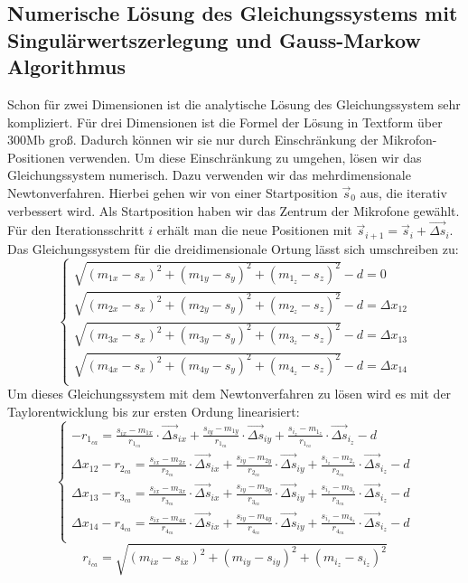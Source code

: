\subsection{Numerische Lösung des Gleichungssystems mit Singulärwertszerlegung und Gauss-Markow Algorithmus}
Schon für zwei Dimensionen ist die analytische Lösung des Gleichungssystem sehr kompliziert. Für drei Dimensionen ist die Formel der Lösung in Textform über 300Mb groß. Dadurch können wir sie nur durch Einschränkung der Mikrofon-Positionen verwenden. Um diese Einschränkung zu umgehen, lösen wir das Gleichungssystem numerisch. Dazu verwenden wir das mehrdimensionale Newtonverfahren. Hierbei gehen wir von einer Startposition $\vec{s}_0$ aus, die iterativ verbessert wird. Als Startposition haben wir das Zentrum der Mikrofone gewählt. Für den Iterationsschritt $i$ erhält man die neue Positionen mit $\vec{s}_{i + 1} = \vec{s}_i + \vec{\Delta{s}}_i$. Das Gleichungssystem für die dreidimensionale Ortung lässt sich umschreiben zu:
$$\begin{cases}
\sqrt{(m_{1x} - s_x)^2 + (m_{1y} - s_y)^2 + (m_{1_z} - s_z)^2} - d = 0 \\
\sqrt{(m_{2x} - s_x)^2 + (m_{2y} - s_y)^2 + (m_{2_z} - s_z)^2} - d = \Delta{x_{12}} \\
\sqrt{(m_{3x} - s_x)^2 + (m_{3y} - s_y)^2 + (m_{3_z} - s_z)^2} - d = \Delta{x_{13}} \\
\sqrt{(m_{4x} - s_x)^2 + (m_{4y} - s_y)^2 + (m_{4_z} - s_z)^2} - d = \Delta{x_{14}} \\
\end{cases}$$
Um dieses Gleichungssystem mit dem Newtonverfahren zu lösen wird es mit der Taylorentwicklung bis zur ersten Ordung linearisiert:
$$\begin{cases}
-r_{1_{ca}} = \frac{s_{ix} - m_{1x}}{r_{1_{ca}}} \cdot \vec{\Delta{s}}_{ix} + \frac{s_{iy} - m_{1y}}{r_{1_{ca}}} \cdot \vec{\Delta{s}}_{iy} + \frac{s_{i_z} - m_{1_z}}{r_{1_{ca}}} \cdot \vec{\Delta{s}}_{i_z} - d \\
\Delta{x_{12}} - r_{2_{ca}} = \frac{s_{ix} - m_{2x}}{r_{2_{ca}}} \cdot \vec{\Delta{s}}_{ix} + \frac{s_{iy} - m_{2y}}{r_{2_{ca}}} \cdot \vec{\Delta{s}}_{iy} + \frac{s_{i_z} - m_{2_z}}{r_{2_{ca}}} \cdot \vec{\Delta{s}}_{i_z} - d \\
\Delta{x_{13}} - r_{3_{ca}} = \frac{s_{ix} - m_{3x}}{r_{3_{ca}}} \cdot \vec{\Delta{s}}_{ix} + \frac{s_{iy} - m_{3y}}{r_{3_{ca}}} \cdot \vec{\Delta{s}}_{iy} + \frac{s_{i_z} - m_{3_z}}{r_{3_{ca}}} \cdot \vec{\Delta{s}}_{i_z} - d \\
\Delta{x_{14}} - r_{4_{ca}} = \frac{s_{ix} - m_{4x}}{r_{4_{ca}}} \cdot \vec{\Delta{s}}_{ix} + \frac{s_{iy} - m_{4y}}{r_{4_{ca}}} \cdot \vec{\Delta{s}}_{iy} + \frac{s_{i_z} - m_{4_z}}{r_{4_{ca}}} \cdot \vec{\Delta{s}}_{i_z} - d \\
\end{cases}$$
$$r_{i_{ca}} = \sqrt{(m_{ix} - s_{ix})^2 + (m_{iy} - s_{iy})^2 + (m_{i_z} - s_{i_z})^2}$$

